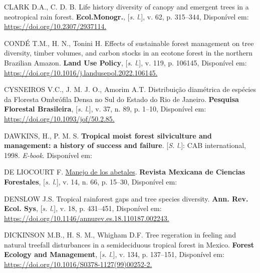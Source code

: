 \documentclass[
]{article}
\newlength{\cslhangindent}
\newlength{\cslentryspacingunit} %
\newenvironment{CSLReferences}[2] %
 {%
  \setlength{\parindent}{0pt}
  \ifodd #1
  \let\oldpar\par
  \def\par{\hangindent=\cslhangindent\oldpar}
  \fi
  \setlength{\parskip}{#2\cslentryspacingunit}
 }%
 {}
\begin{document}
\begin{CSLReferences}{0}{1}
\leavevmode{}%
CLARK D.A., C. D. B. Life history diversity of canopy and emergent trees
in a neotropical rain forest. \textbf{Ecol.Monogr.}, {[}\emph{s. l.}{]},
v. 62, p. 315--344, Disponível em:
\href{https://doi.org/10.2307/2937114}{https://doi.org/10.2307/2937114.
}

\leavevmode{}%
CONDÉ T.M., H. N., Tonini H. Effects of sustainable forest management on
tree diversity, timber volumes, and carbon stocks in an ecotone forest
in the northern Brazilian Amazon. \textbf{Land Use Policy}, {[}\emph{s.
l.}{]}, v. 119, p. 106145, Disponível em:
\href{https://doi.org/10.1016/j.landusepol.2022.106145}{https://doi.org/10.1016/j.landusepol.2022.106145.
}

\leavevmode{}%
CYSNEIROS V.C., J. M. J. O., Amorim A.T. Distribuição diamétrica de
espécies da Floresta Ombrófila Densa no Sul do Estado do Rio de Janeiro.
\textbf{Pesquisa Florestal Brasileira}, {[}\emph{s. l.}{]}, v. 37, n.
89, p. 1--10, Disponível em:
\href{https://doi.org/10.1093/jof/50.2.85}{https://doi.org/10.1093/jof/50.2.85.
}

\leavevmode{}%
DAWKINS, H., P. M. S. \textbf{Tropical moist forest silviculture and
management: a history of success and failure}. {[}\emph{S. l.}{]}: {CAB
international}, 1998. \emph{E-book}. Disponível em:

\leavevmode{}%
DE LIOCOURT F. \href{}{Manejo de los abetales}. \textbf{Revista Mexicana
de Ciencias Forestales}, {[}\emph{s. l.}{]}, v. 14, n. 66, p. 15--30,
Disponível em:

\leavevmode{}%
DENSLOW J.S. Tropical rainforest gaps and tree species diversity.
\textbf{Ann. Rev. Ecol. Sys}, {[}\emph{s. l.}{]}, v. 18, p. 431--451,
Disponível em:
\href{https://doi.org/10.1146/annurev.es.18.110187.002243}{https://doi.org/10.1146/annurev.es.18.110187.002243.
}

\leavevmode{}%
DICKINSON M.B., H. S. M., Whigham D.F. Tree regeration in feeling and
natural treefall disturbances in a semideciduous tropical forest in
Mexico. \textbf{Forest Ecology and Management}, {[}\emph{s. l.}{]}, v.
134, p. 137--151, Disponível em:
\href{https://doi.org/10.1016/S0378-1127(99)00252-2}{https://doi.org/10.1016/S0378-1127(99)00252-2.
}


\end{CSLReferences}
\end{document}
